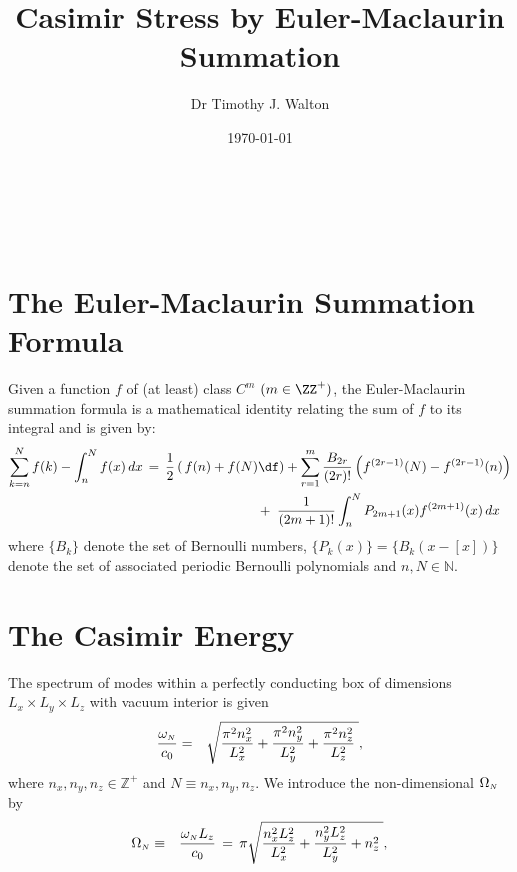 \documentclass[sections]{tjwNOTES}
\title{Casimir Stress by Euler-Maclaurin Summation}
\author{Dr Timothy J. Walton}
\date{\today}
\newcommand\nx{n_{x}}
\newcommand\ny{n_{y}}
\newcommand\nz{n_{z}}
\newcommand\Lx{L_{x}}
\newcommand\Ly{L_{y}}
\newcommand\Lz{L_{z}}
\newcommand\N{\mbox{\tiny $N$}}
\begin{document}
\maketitle
\makebox[\linewidth]{\rule{\linewidth}{1.2pt}}\\[-1.3cm]
\tableofcontents
\quad \\[-0.2cm]
\makebox[\linewidth]{\rule{\linewidth}{1.pt}}
\section{The Euler-Maclaurin Summation Formula}
\begin{defn}
	Given a function $f$ of (at least) class $C^{m}$ $(m\in\ZZ^{+})$, the Euler-Maclaurin summation formula is a mathematical identity relating the sum of $f$ to its integral and is given by:
	\begin{align}
	\begin{split}\label{EMformula}
		\sum_{k=n}^{N} f(k) - \int_{n}^{N}f(x)\,dx &\,=\, \frac{1}{2}\left(\,f(n) + f(N)\df\right) + \sum_{r=1}^{m}\frac{B_{2r}}{(2r)!}\left(f^{(2r-1)}(N) - f^{(2r-1)}(n)\right) \\
		& \hspace{3cm} + \;\frac{1}{(2m+1)!}\int_{n}^{N} P_{2m+1}(x)f^{(2m+1)}(x) \,dx
	\end{split}
	\end{align}
	where $\{B_{k}\}$ denote the set of Bernoulli numbers, $\{P_{k}(x)\}=\{B_{k}(x-[x])\}$ denote the set of associated periodic Bernoulli polynomials and $n,N\in\mathbb{N}$.
\end{defn}

\section{The Casimir Energy}
The spectrum of modes within a perfectly conducting box of dimensions $\Lx\times\Ly\times\Lz$ with vacuum interior is given
\begin{eqnarray*}
    \frac{\omega_{\N}}{c_{0}} &=& \sqrt{ \frac{\pi^{2}\nx^{2}}{\Lx^{2}} + \frac{\pi^{2}\ny^{2}}{\Ly^{2}} + \frac{\pi^{2}\nz^{2}}{\Lz^{2}} \;},
\end{eqnarray*}
where $\nx,\ny,\nz\in\mathbb{Z}^{+}$ and $N\equiv \nx,\ny,\nz$. We introduce the non-dimensional $\Omega_{\N}$ by
\begin{eqnarray}\label{Om}
    \Omega_{\N} &\equiv& \frac{\omega_{\N}\Lz}{c_{0}} \,=\, \pi\sqrt{ \frac{\nx^{2}\Lz^{2}}{\Lx^{2}} + \frac{\ny^{2}\Lz^{2}}{\Ly^{2}} + \nz^{2} \;},
\end{eqnarray}
\end{document}
